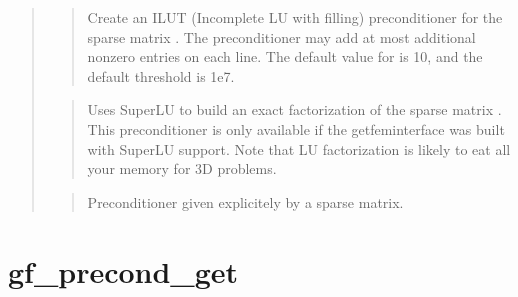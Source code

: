\documentclass[a4paper,11pt,english]{sphinxmanual}
\begin{document}
\begin{quote}
\begin{quote}

Create an ILUT (Incomplete LU with filling) preconditioner for the
sparse matrix . The preconditioner may add at most 
additional non\sphinxhyphen{}zero entries on each line. The default value for
 is 10, and the default threshold is 1e\sphinxhyphen{}7.
\end{quote}

\begin{quote}

Uses SuperLU to build an exact factorization of the sparse matrix .
This preconditioner is only available if the getfem\sphinxhyphen{}interface was
built with SuperLU support. Note that LU factorization is likely to
eat all your memory for 3D problems.
\end{quote}

\begin{quote}

Preconditioner given explicitely by a sparse matrix.
\end{quote}
\end{quote}


\section{gf\_precond\_get}
\label{\detokenize{matlab_octave/cmdref_gf_precond_get:gf-precond-get}}\label{\detokenize{matlab_octave/cmdref_gf_precond_get::doc}}
\end{document}
